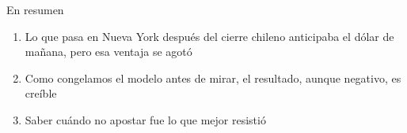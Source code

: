 \documentclass[aspectratio=169,11pt]{beamer}
\begin{document}
\begin{frame}{En resumen}
\begin{enumerate}\setlength\itemsep{6mm}
\item {\large Lo que pasa en Nueva York después del cierre chileno anticipaba el dólar de mañana, pero esa ventaja se agotó}
\item {\large Como congelamos el modelo antes de mirar, el resultado, aunque negativo, es creíble}
\item {\large Saber cuándo no apostar fue lo que mejor resistió}
\end{enumerate}
\vfill{}
\end{frame}
\end{document}
